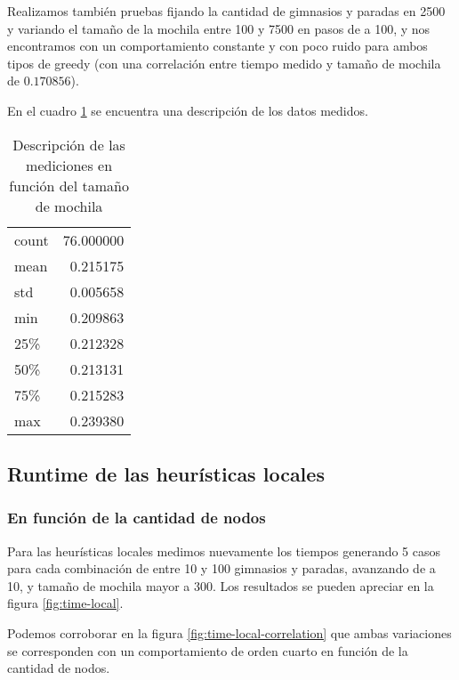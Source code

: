 Realizamos también pruebas fijando la cantidad de gimnasios y paradas en 2500 y variando el tamaño de la mochila entre 100 y 7500 en pasos de a 100, y nos encontramos con un comportamiento constante y con poco ruido para ambos tipos de greedy (con una correlación entre tiempo medido y tamaño de mochila de $0.170856$).

En el cuadro \ref{tab:time-greedy-moch} se encuentra una descripción de los datos medidos.

\begin{table}[H]
    \begin{center}
        \begin{tabular}{ l | r }
            count  & 76.000000 \\
            mean   &  0.215175 \\
            std    &  0.005658 \\
            min    &  0.209863 \\
            25\%   &  0.212328 \\
            50\%   &  0.213131 \\
            75\%   &  0.215283 \\
            max    &  0.239380 \\
        \end{tabular}
        \caption{Descripción de las mediciones en función del tamaño de mochila}\label{tab:time-greedy-moch}
    \end{center}
\end{table}

\subsection{Runtime de las heurísticas locales}

\subsubsection{En función de la cantidad de nodos}

Para las heurísticas locales medimos nuevamente los tiempos generando 5 casos para cada combinación de entre 10 y 100 gimnasios y paradas, avanzando de a 10, y tamaño de mochila mayor a 300. Los resultados se pueden apreciar en la figura \ref{fig:time-local}.

Podemos corroborar en la figura \ref{fig:time-local-correlation} que ambas variaciones se corresponden con un comportamiento de orden cuarto en función de la cantidad de nodos.

